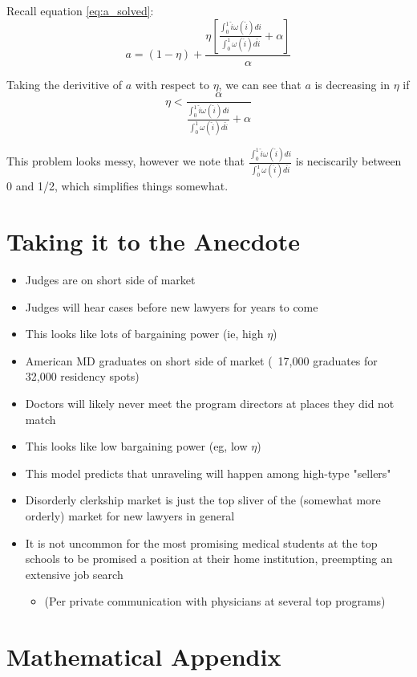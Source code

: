 \documentclass[WP]{AEA}
\begin{document}
Recall equation \ref{eq:a_solved}:
\begin{equation*}
 	a= (1-\eta) + \frac{   \eta\left[ \frac{\int_0^1 \hat{i} \omega(\hat{i}) di}{\int_0^1  \omega(\hat{i}) d\hat{i}} + \alpha  \right] }{\alpha} 
\end{equation*}

Taking the derivitive of $a$ with respect to $\eta$, we can see that 
$a$ is decreasing in $\eta$ if
\begin{equation*}
	\eta  < \frac{\alpha }{ \frac{\int_0^1 \hat{i} \omega(\hat{i}) di}{\int_0^1  \omega(\hat{i}) d\hat{i}} + \alpha  }
\end{equation*}

This problem looks messy, however we note that $ \frac{\int_0^1 \hat{i} \omega(\hat{i}) di}{\int_0^1  \omega(\hat{i}) d\hat{i}}$ is neciscarily between 0 and 1/2, which simplifies things somewhat.


\section{Taking it to the Anecdote}
\begin{itemize}

    \item Judges are on short  side of market
\item Judges will hear cases before new lawyers for years to come
\item This looks like lots of bargaining power (ie, high $\eta$)
\end{itemize}


\begin{itemize}
\item American MD graduates on short side of market (~17,000 graduates for 32,000 residency spots)
\item Doctors will likely never meet the program directors at places they did not match
\item This looks like low bargaining power (eg, low $\eta$)
\end{itemize}


\begin{itemize}
\item This model predicts that unraveling will happen among high-type "sellers"
\item Disorderly clerkship market is just the top sliver of the (somewhat more orderly) market for new lawyers in general
\item It is not  uncommon for the most promising medical students at the top schools to be promised a position at their home institution, preempting an extensive job search
\begin{itemize}
	\item (Per private communication with physicians at several top programs)
\end{itemize}
\end{itemize}




\appendix

\section{Mathematical Appendix}
\end{document}
